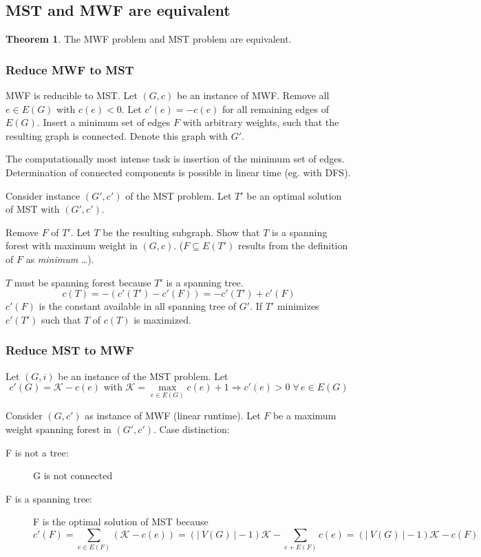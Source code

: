 \documentclass[a4paper]{article}
\theoremstyle{definition}
\newtheorem{theorem}{Theorem}
\newcommand{\card}[1]{\left|\:\!#1\:\!\right|}
\newcommand{\fall}{\;\forall\,}
\begin{document}
\subsection{MST and MWF are equivalent}
%
\begin{theorem}\label{proposition-2.1}
  The MWF problem and MST problem are equivalent.
\end{theorem}

\subsubsection{Reduce MWF to MST}
%
MWF is reducible to MST. Let $(G, c)$ be an instance of MWF. Remove all $e \in E(G)$ with $c(e) < 0$. Let $c'(e) = -c(e)$ for all remaining edges of $E(G)$. Insert a minimum set of edges $F$ with arbitrary weights, such that the resulting graph is connected. Denote this graph with $G'$.

The computationally most intense task is insertion of the minimum set of edges. Determination of connected components is possible in linear time (eg. with DFS).

Consider instance $(G', c')$ of the MST problem.  Let $T'$ be an optimal solution of MST with $(G', c')$.

Remove $F$ of $T'$. Let $T$ be the resulting subgraph. Show that $T$ is a spanning forest with maximum weight in $(G, c)$. ($F \subseteq E(T')$ results from the definition of $F$ as \emph{minimum} \dots).

$T$ must be spanning forest because $T'$ is a spanning tree.
\[
  c(T) = -(c'(T') - c'(F)) = -c'(T') + c'(F)
\]
$c'(F)$ is the constant available in all spanning tree of $G'$.
If $T'$ minimizes $c'(T')$ such that $T$ of $c(T)$ is maximized.

\subsubsection{Reduce MST to MWF}
%
Let $(G, i)$ be an instance of the MST problem. Let
\[
  c'(G) = \mathcal{K} - c(e) \text{ with } \mathcal{K} = \max_{e \in E(G)} c(e) + 1
    \Rightarrow c'(e) > 0 \fall e \in E(G)
\]

Consider $(G, c')$ as instance of MWF (linear runtime). Let $F$ be a maximum weight spanning forest in $(G', c')$. Case distinction:
\begin{description}
  \item[F is not a tree:] G is not connected
  \item[F is a spanning tree:] F is the optimal solution of MST because
    \[
      c'(F)
      = \sum_{e \in E(F)} (\mathcal{K} - c(e))
      = (\card{V(G)} - 1) \mathcal{K} - \sum_{e + E(F)} c(e)
      = (\card{V(G)} - 1) \mathcal{K} - c(F)
    \]
\end{description}
\end{document}

